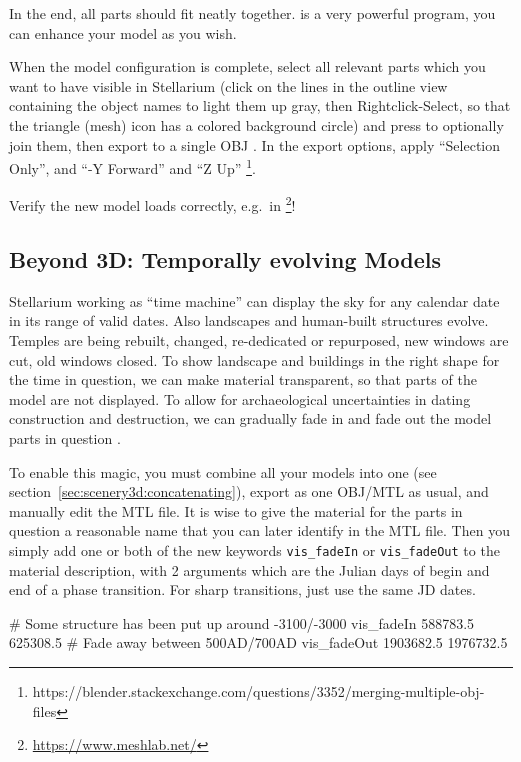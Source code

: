 In the end, all parts should fit neatly together.  is
a very powerful program, you can enhance your model as you wish.

When the model configuration is complete, select all relevant parts
which you want to have visible in Stellarium (click on the lines in
the outline view containing the object names to light them up gray,
then Rightclick-Select, so that the triangle (mesh) icon has a colored
background circle) and press  to optionally join them,
then export to a single OBJ . In the
export options, apply ``Selection Only'', and ``-Y Forward'' and ``Z
Up''%
\footnote{https://blender.stackexchange.com/questions/3352/merging-multiple-obj-files}.

Verify the new model loads correctly, e.g.\ in \footnote{\url{https://www.meshlab.net/}}!

\subsection{Beyond 3D: Temporally evolving Models}
\label{sec:scenery3d:Beyond3D}

Stellarium  working as ``time machine'' can display the sky for any calendar date in its range of valid dates. 
Also landscapes and human-built structures evolve. Temples are being rebuilt, changed, re-dedicated or repurposed, 
new windows are cut, old windows closed. 
To show landscape and buildings in the right shape for the time in question, we can make material transparent, 
so that parts of the model are not displayed.  To allow for archaeological uncertainties in dating 
construction and destruction, we can gradually fade in and fade out the model parts in question \citep{Zotti:SEAC2017}.

To enable this magic, you must combine all your models into one (see section~\ref{sec:scenery3d:concatenating}), 
export as one OBJ/MTL as usual, and manually edit the MTL file. It is wise to give the material 
for the parts in question a reasonable name that you can later identify in the MTL file.
Then you simply add one or both of the new keywords \texttt{vis\_fadeIn} or \texttt{vis\_fadeOut} 
to the material description,  with 2 arguments which are the Julian days of begin and end of a phase transition. 
For sharp transitions, just use the same JD dates.

\begin{configfile}
# Some structure has been put up around -3100/-3000
vis_fadeIn  588783.5 625308.5
# Fade away between 500AD/700AD
vis_fadeOut 1903682.5 1976732.5
\end{configfile}
 

